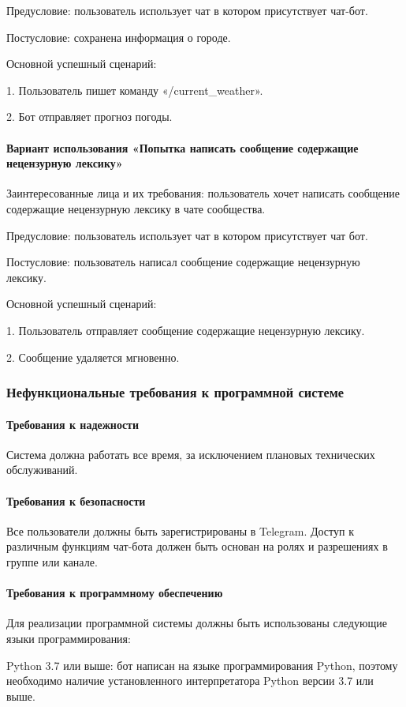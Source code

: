 Предусловие: пользователь использует чат в котором присутствует чат-бот.

Постусловие: сохранена информация о городе.

Основной успешный сценарий:

1.	Пользователь пишет команду «/current\_weather».

2.	Бот отправляет прогноз погоды.

\paragraph{Вариант использования «Попытка написать сообщение содержащие нецензурную лексику»}

Заинтересованные лица и их требования: пользователь хочет написать сообщение содержащие нецензурную лексику в чате сообщества.

Предусловие: пользователь использует чат в котором присутствует чат бот.

Постусловие: пользователь написал сообщение содержащие нецензурную лексику. 

Основной успешный сценарий:

1.	Пользователь отправляет сообщение содержащие нецензурную лексику.

2.	Сообщение удаляется мгновенно.
\subsubsection{Нефункциональные требования к программной системе}
\paragraph{Требования к надежности}
Система должна работать все время, за исключением плановых технических обслуживаний.
\paragraph{Требования к безопасности}
Все пользователи должны быть зарегистрированы в Telegram. Доступ к различным функциям чат-бота должен быть основан на ролях и разрешениях в группе или канале.
\paragraph{Требования к программному обеспечению}
Для реализации программной системы должны быть использованы следующие языки программирования:

Python 3.7 или выше: бот написан на языке программирования Python, поэтому необходимо наличие установленного интерпретатора Python версии 3.7 или выше.

